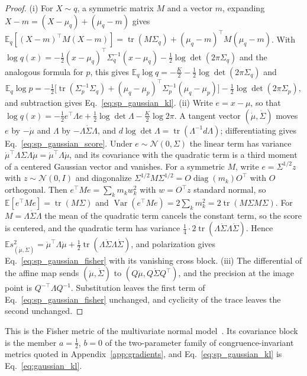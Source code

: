 \begin{proof}
(i) For $X\sim q$, a symmetric matrix $M$ and a vector $m$, expanding $X-m=(X-\mu_q)+(\mu_q-m)$ gives $\mathbb E_q[(X-m)^\top M(X-m)]=\operatorname{tr}(M\Sigma_q)+(\mu_q-m)^\top M(\mu_q-m)$. With $\log q(x)=-\tfrac12(x-\mu_q)^\top\Sigma_q^{-1}(x-\mu_q)-\tfrac12\log\det(2\pi\Sigma_q)$ and the analogous formula for $p$, this gives $\mathbb E_q\log q=-\tfrac K2-\tfrac12\log\det(2\pi\Sigma_q)$ and
\begin{equation*}
\mathbb E_q\log p=-\tfrac12\big[\operatorname{tr}(\Sigma_p^{-1}\Sigma_q)+(\mu_q-\mu_p)^\top\Sigma_p^{-1}(\mu_q-\mu_p)\big]-\tfrac12\log\det(2\pi\Sigma_p),
\end{equation*}
and subtraction gives Eq.~\eqref{eq:sp_gaussian_kl}.
(ii) Write $e=x-\mu$, so that $\log q(x)=-\tfrac12e^\top\Lambda e+\tfrac12\log\det\Lambda-\tfrac K2\log2\pi$. A tangent vector $(\dot\mu,\dot\Sigma)$ moves $e$ by $-\dot\mu$ and $\Lambda$ by $-\Lambda\dot\Sigma\Lambda$, and $d\log\det\Lambda=\operatorname{tr}(\Lambda^{-1}d\Lambda)$; differentiating gives Eq.~\eqref{eq:sp_gaussian_score}. Under $e\sim\mathcal N(0,\Sigma)$ the linear term has variance $\dot\mu^\top\Lambda\Sigma\Lambda\dot\mu=\dot\mu^\top\Lambda\dot\mu$, and its covariance with the quadratic term is a third moment of a centered Gaussian vector and vanishes. For a symmetric $M$, write $e=\Sigma^{1/2}z$ with $z\sim\mathcal N(0,I)$ and diagonalize $\Sigma^{1/2}M\Sigma^{1/2}=O\operatorname{diag}(m_k)O^\top$ with $O$ orthogonal. Then $e^\top Me=\sum_km_kw_k^2$ with $w=O^\top z$ standard normal, so $\mathbb E[e^\top Me]=\operatorname{tr}(M\Sigma)$ and $\operatorname{Var}(e^\top Me)=2\sum_km_k^2=2\operatorname{tr}(M\Sigma M\Sigma)$. For $M=\Lambda\dot\Sigma\Lambda$ the mean of the quadratic term cancels the constant term, so the score is centered, and the quadratic term has variance $\tfrac14\cdot2\operatorname{tr}(\Lambda\dot\Sigma\Lambda\dot\Sigma)$. Hence $\mathbb E s_{(\dot\mu,\dot\Sigma)}^2=\dot\mu^\top\Lambda\dot\mu+\tfrac12\operatorname{tr}(\Lambda\dot\Sigma\Lambda\dot\Sigma)$, and polarization gives Eq.~\eqref{eq:sp_gaussian_fisher} with its vanishing cross block.
(iii) The differential of the affine map sends $(\dot\mu,\dot\Sigma)$ to $(Q\dot\mu,Q\dot\Sigma Q^\top)$, and the precision at the image point is $Q^{-\top}\Lambda Q^{-1}$. Substitution leaves the first term of Eq.~\eqref{eq:sp_gaussian_fisher} unchanged, and cyclicity of the trace leaves the second unchanged.
\end{proof}
This is the Fisher metric of the multivariate normal model~\cite{Skovgaard1984}. Its covariance block is the member $a=\tfrac12$, $b=0$ of the two-parameter family of congruence-invariant metrics quoted in Appendix~\ref{app:gradients}, and Eq.~\eqref{eq:sp_gaussian_kl} is Eq.~\eqref{eq:gaussian_kl}.

